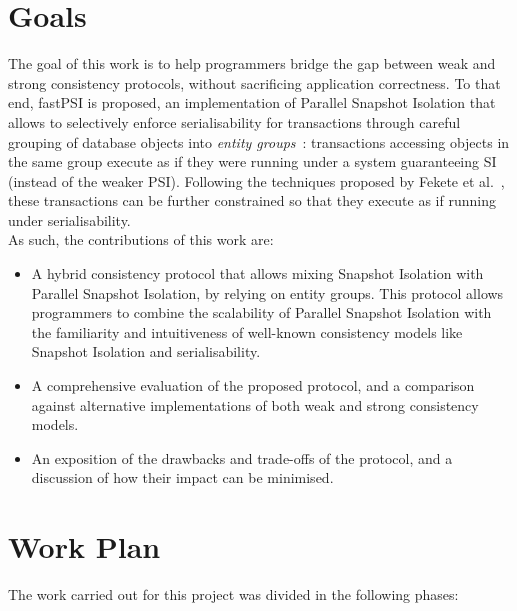 \section{Goals}

The goal of this work is to help programmers bridge the gap between weak and strong consistency protocols, without sacrificing application correctness. To that end, fastPSI is proposed, an implementation of Parallel Snapshot Isolation that allows to selectively enforce serialisability for transactions through careful grouping of database objects into \emph{entity groups}~\citep{baker_megastore}: transactions accessing objects in the same group execute as if they were running under a system guaranteeing SI (instead of the weaker PSI). Following the techniques proposed by Fekete et al.~\citep{fekete_ssi}, these transactions can be further constrained so that they execute as if running under serialisability.\\

As such, the contributions of this work are:

\begin{itemize}
    \item A hybrid consistency protocol that allows mixing Snapshot Isolation with Parallel Snapshot Isolation, by relying on entity groups. This protocol allows programmers to combine the scalability of Parallel Snapshot Isolation with the familiarity and intuitiveness of well-known consistency models like Snapshot Isolation and serialisability.

    \item A comprehensive evaluation of the proposed protocol, and a comparison against alternative implementations of both weak and strong consistency models.

    \item An exposition of the drawbacks and trade-offs of the protocol, and a discussion of how their impact can be minimised.
\end{itemize}

\section{Work Plan}

The work carried out for this project was divided in the following phases:

